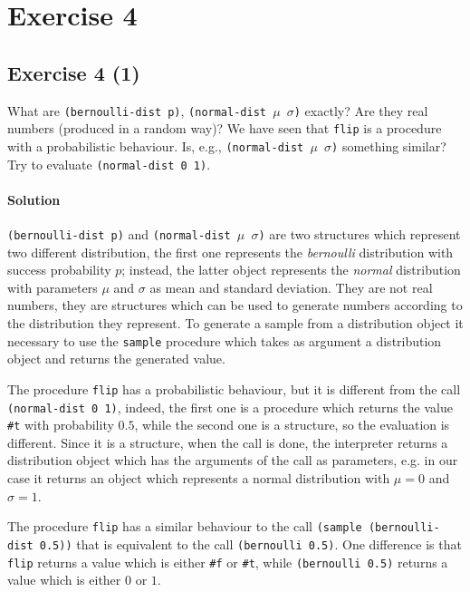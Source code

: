\section*{Exercise 4}

\subsection*{Exercise 4 (1)}
What are \texttt{(bernoulli-dist p)}, \texttt{(normal-dist $\mu$ $\sigma$)} exactly? Are they real numbers 
(produced in a random way)?
We have seen that \texttt{flip} is a procedure with a probabilistic behaviour. 
Is, e.g., \texttt{(normal-dist $\mu$ $\sigma$)} something similar?
Try to evaluate \texttt{(normal-dist 0 1)}.

\paragraph{Solution}
\texttt{(bernoulli-dist p)} and \texttt{(normal-dist $\mu$ $\sigma$)} are two structures which represent 
two different distribution, the first one represents the \textit{bernoulli} distribution with success probability $p$; 
instead, the latter object represents the \textit{normal} distribution with parameters $\mu$ and $\sigma$ as mean and
standard deviation.
They are not real numbers, they are structures which can be used to generate numbers according to the distribution they represent.
To generate a sample from a distribution object it necessary to use the \texttt{sample} procedure which takes as argument a 
distribution object and returns the generated value.

The procedure \texttt{flip} has a probabilistic behaviour, but it is different from the call \texttt{(normal-dist 0 1)}, indeed, the 
first one is a procedure which returns the value \texttt{\#t} with probability $0.5$, while the second one is a structure, so the 
evaluation is different. Since it is a structure, when the call is done, the interpreter returns a distribution object which
has the arguments of the call as parameters, e.g. in our case it returns an object which represents a normal distribution with 
$ \mu = 0 $ and $ \sigma = 1 $.

The procedure \texttt{flip} has a similar behaviour to the call \texttt{(sample (bernoulli-dist 0.5))} that is equivalent to the call
\texttt{(bernoulli 0.5)}. One difference is that \texttt{flip} returns a value which is either \texttt{\#f} or \texttt{\#t}, while 
\texttt{(bernoulli 0.5)} returns a value which is either $0$ or $1$.


